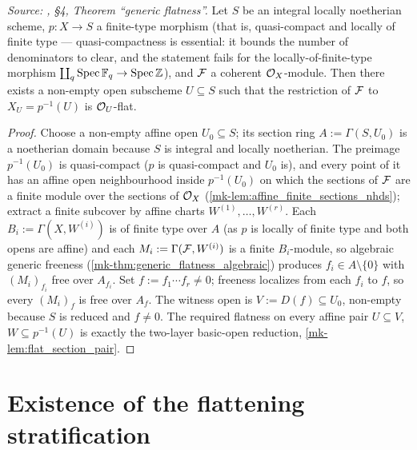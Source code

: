 \begin{theorem}
  \label{mk-thm:generic_flatness}
  \leanok

  \textit{Source: \cite{nitsure-hilbert-quot}, \S4, Theorem ``generic flatness''.}
  Let \(S\) be an integral locally noetherian scheme, \(p : X \to S\) a
  finite-type morphism (that is, quasi-compact and locally of finite type —
  quasi-compactness is essential: it bounds the number of denominators to
  clear, and the statement fails for the locally-of-finite-type morphism
  \(\coprod_q \operatorname{Spec} \mathbb{F}_q \to \operatorname{Spec} \mathbb{Z}\)), and \(\mathcal{F}\) a coherent
  \(\mathcal{O}_X\)-module. Then there exists a non-empty open subscheme
  \(U \subseteq S\) such that the restriction of \(\mathcal{F}\) to
  \(X_U = p^{-1}(U)\) is \(\mathcal{O}_U\)-flat.
\end{theorem}

\begin{proof}
  \leanok
  Choose a non-empty affine open \(U_0 \subseteq S\); its section ring
  \(A := \Gamma(S, U_0)\) is a noetherian domain because \(S\) is integral and
  locally noetherian. The preimage \(p^{-1}(U_0)\) is quasi-compact
  (\(p\) is quasi-compact and \(U_0\) is), and every point of it has an
  affine open neighbourhood inside \(p^{-1}(U_0)\) on which the sections of
  \(\mathcal{F}\) are a finite module over the sections of \(\mathcal{O}_X\)
  (\ref{mk-lem:affine_finite_sections_nhds}); extract a finite subcover by
  affine charts \(W^{(1)}, \dots, W^{(r)}\). Each
  \(B_i := \Gamma(X, W^{(i)})\) is of finite type over \(A\) (as \(p\) is
  locally of finite type and both opens are affine) and each
  \(M_i := \Gamma(\mathcal{F}, W^{(i)})\) is a finite \(B_i\)-module, so algebraic
  generic freeness (\ref{mk-thm:generic_flatness_algebraic}) produces
  \(f_i \in A \setminus \{0\}\) with \((M_i)_{f_i}\) free over \(A_{f_i}\).
  Set \(f := f_1 \cdots f_r \ne 0\); freeness localizes from each \(f_i\) to
  \(f\), so every \((M_i)_f\) is free over \(A_f\). The witness open is
  \(V := D(f) \subseteq U_0\), non-empty because \(S\) is reduced and
  \(f \ne 0\). The required flatness on every affine pair
  \(U \subseteq V\), \(W \subseteq p^{-1}(U)\) is exactly the two-layer
  basic-open reduction, \ref{mk-lem:flat_section_pair}.
\end{proof}

\section{Existence of the flattening stratification}
\label{mk-sec:flatstrat_exists}

